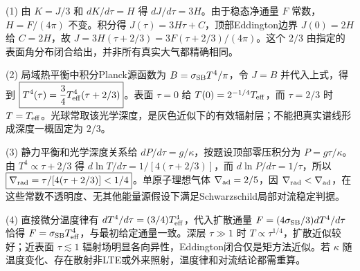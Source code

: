 (1) 由 \(K=J/3\) 和 \(dK/d\tau=H\) 得 \(dJ/d\tau=3H\)。由于稳态净通量 \(F\) 常数，\(H=F/(4\pi)\) 不变。积分得 \(J(\tau)=3H\tau+C\)，顶部Eddington边界 \(J(0)=2H\) 给 \(C=2H\)，故 \(\boxed{J=3H(\tau+2/3)=3F(\tau+2/3)/(4\pi)}\)。这个 \(2/3\) 由指定的表面角分布闭合给出，并非所有真实大气都精确相同。

(2) 局域热平衡中积分Planck源函数为 \(B=\sigma_{\rm SB}T^4/\pi\)，令 \(J=B\) 并代入上式，得到 \(\boxed{T^4(\tau)=\frac34T_{\rm eff}^4(\tau+2/3)}\)。表面 \(\tau=0\) 给 \(T(0)=2^{-1/4}T_{\rm eff}\)，而 \(\tau=2/3\) 时 \(T=T_{\rm eff}\)。光球常取该光学深度，是灰色近似下的有效辐射层；不能把真实谱线形成深度一概固定为 \(2/3\)。

(3) 静力平衡和光学深度关系给 \(dP/d\tau=g/\kappa\)，按题设顶部零压积分为 \(\boxed{P=g\tau/\kappa}\)。由 \(T^4\propto\tau+2/3\) 得 \(d\ln T/d\tau=1/[4(\tau+2/3)]\)，而 \(d\ln P/d\tau=1/\tau\)，所以 \(\boxed{\nabla_{\rm rad}=\tau/[4(\tau+2/3)]<1/4}\)。单原子理想气体 \(\nabla_{\rm ad}=2/5\)，因 \(\nabla_{\rm rad}<\nabla_{\rm ad}\)，在这些常数不透明度、无其他能量源假设下满足Schwarzschild局部对流稳定判据。

(4) 直接微分温度律有 \(dT^4/d\tau=(3/4)T_{\rm eff}^4\)，代入扩散通量 \(F=(4\sigma_{\rm SB}/3)dT^4/d\tau\) 恰得 \(F=\sigma_{\rm SB}T_{\rm eff}^4\)，与最初给定通量一致。深层 \(\tau\gg1\) 时 \(T\propto\tau^{1/4}\)，扩散近似较好；近表面 \(\tau\lesssim1\) 辐射场明显各向异性，Eddington闭合仅是矩方法近似。若 \(\kappa\) 随温度变化、存在散射非LTE或外来照射，温度律和对流结论都需重算。
